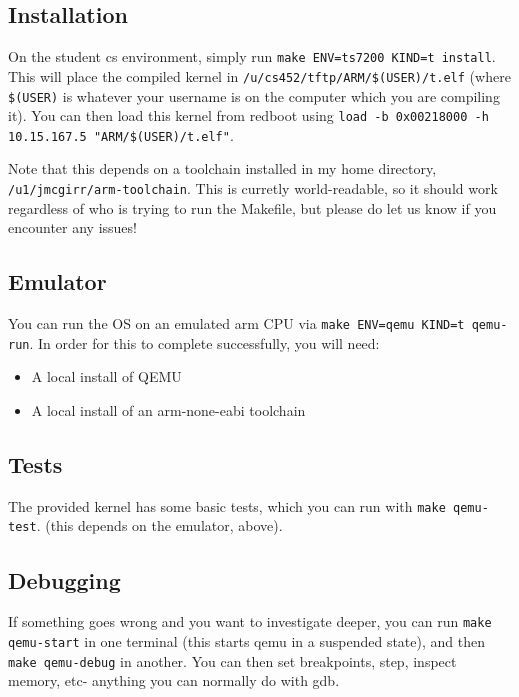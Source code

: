 \subsection{Installation}\label{installation}

On the student cs environment, simply run
\texttt{make ENV=ts7200 KIND=t install}. This will place the compiled
kernel in \texttt{/u/cs452/tftp/ARM/\$(USER)/t.elf} (where
\texttt{\$(USER)} is whatever your username is on the computer which you
are compiling it). You can then load this kernel from redboot using
\texttt{load -b 0x00218000 -h 10.15.167.5 "ARM/\$(USER)/t.elf"}.

Note that this depends on a toolchain installed in my home directory,
\texttt{/u1/jmcgirr/arm-toolchain}. This is curretly world-readable, so
it should work regardless of who is trying to run the Makefile, but
please do let us know if you encounter any issues!

\subsection{Emulator}\label{emulator}

You can run the OS on an emulated arm CPU via
\texttt{make ENV=qemu KIND=t qemu-run}. In order for this to complete
successfully, you will need:

\begin{itemize}
\itemsep1pt\parskip0pt
\item
  A local install of QEMU
\item
  A local install of an arm-none-eabi toolchain
\end{itemize}

\subsection{Tests}\label{tests}

The provided kernel has some basic tests, which you can run with
\texttt{make qemu-test}. (this depends on the emulator, above).

\subsection{Debugging}\label{debugging}

If something goes wrong and you want to investigate deeper, you can run
\texttt{make qemu-start} in one terminal (this starts qemu in a
suspended state), and then \texttt{make qemu-debug} in another. You can
then set breakpoints, step, inspect memory, etc- anything you can
normally do with gdb.

